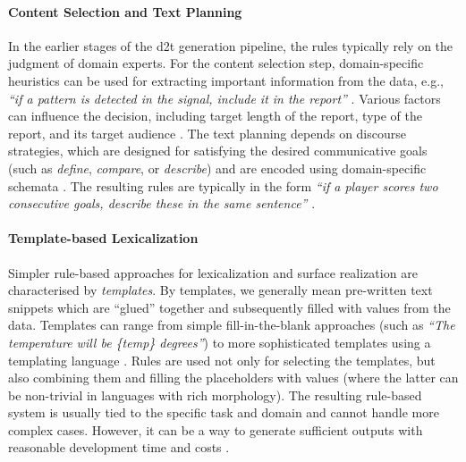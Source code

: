 {\paragraph{Content Selection and Text Planning} In the earlier stages of the \ac{d2t} generation pipeline, the rules typically rely on the judgment of domain experts. For the content selection step, domain-specific heuristics can be used for extracting important information from the data, e.g., \textit{``if a pattern is detected in the signal, include it in the report''} \cite{portet2009automatic}. Various factors can influence the decision, including target length of the report, type of the report, and its target audience \cite{gkatziaContentSelectionDatatoText2016}. The text planning depends on discourse strategies, which are designed for satisfying the desired communicative goals (such as \emph{define}, \emph{compare}, or \emph{describe}) and are encoded using domain-specific schemata \cite{mckeown1985text}. The resulting rules are typically in the form \textit{``if a player scores two consecutive goals, describe these in the same sentence''}  \cite{gattSurveyStateArt2018}.


\paragraph{Template-based Lexicalization} Simpler rule-based approaches for lexicalization and surface realization are characterised by \emph{templates}. By templates, we generally mean pre-written text snippets which are ``glued'' together and subsequently filled with values from the data. Templates can range from simple fill-in-the-blank approaches (such as \textit{``The temperature will be \{temp\} degrees''}) to more sophisticated templates using a templating language \cite{gatt2009simplenlg,reiter2016nlg}.  Rules are used not only for selecting the templates, but also combining them and filling the placeholders with values (where the latter can be non-trivial in languages with rich morphology). The resulting rule-based system is usually tied to the specific task and domain and cannot handle more complex cases. However, it can be a way to generate sufficient outputs with reasonable development time and costs \cite{vanderleeAutomatedLearningTemplates2018}.


}

